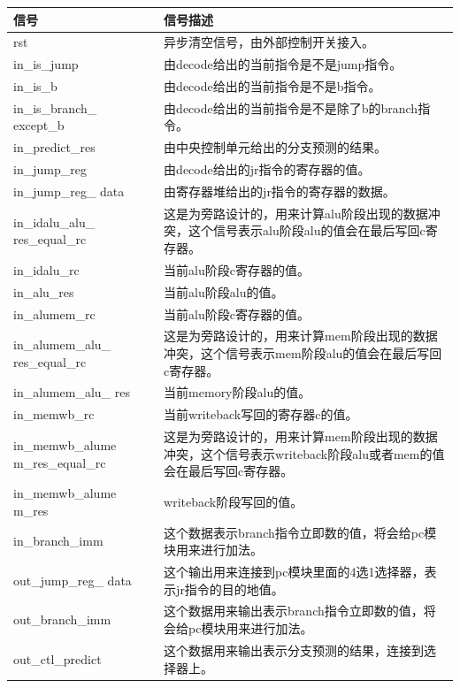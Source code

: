 \begin{center}
    \label{table:predict}
    \begin{longtable}{p{}p{}}
        \toprule
        信号 & 信号描述 \\
        \midrule
            rst & 异步清空信号，由外部控制开关接入。\\
            in\_is\_jump & 由decode给出的当前指令是不是jump指令。\\
            in\_is\_b & 由decode给出的当前指令是不是b指令。\\
            in\_is\_branch\_  except\_b & 由decode给出的当前指令是不是除了b的branch指令。 \\
            in\_predict\_res & 由中央控制单元给出的分支预测的结果。\\
            in\_jump\_reg & 由decode给出的jr指令的寄存器的值。\\
            in\_jump\_reg\_  data & 由寄存器堆给出的jr指令的寄存器的数据。\\
            in\_idalu\_alu\_  res\_equal\_rc & 这是为旁路设计的，用来计算alu阶段出现的数据冲突，这个信号表示alu阶段alu的值会在最后写回c寄存器。\\
            in\_idalu\_rc & 当前alu阶段c寄存器的值。\\
            in\_alu\_res & 当前alu阶段alu的值。\\
            in\_alumem\_rc & 当前alu阶段c寄存器的值。\\
            in\_alumem\_alu\_  res\_equal\_rc & 这是为旁路设计的，用来计算mem阶段出现的数据冲突，这个信号表示mem阶段alu的值会在最后写回c寄存器。\\
            in\_alumem\_alu\_  res & 当前memory阶段alu的值。\\
            in\_memwb\_rc & 当前writeback写回的寄存器c的值。\\
            in\_memwb\_alume  m\_res\_equal\_rc & 这是为旁路设计的，用来计算mem阶段出现的数据冲突，这个信号表示writeback阶段alu或者mem的值会在最后写回c寄存器。\\
            in\_memwb\_alume  m\_res & writeback阶段写回的值。\\
            in\_branch\_imm & 这个数据表示branch指令立即数的值，将会给pc模块用来进行加法。\\
            out\_jump\_reg\_  data & 这个输出用来连接到pc模块里面的4选1选择器，表示jr指令的目的地值。\\
            out\_branch\_imm & 这个数据用来输出表示branch指令立即数的值，将会给pc模块用来进行加法。\\
            out\_ctl\_predict & 这个数据用来输出表示分支预测的结果，连接到选择器上。\\
        \bottomrule
    \end{longtable}
\end{center}
    

